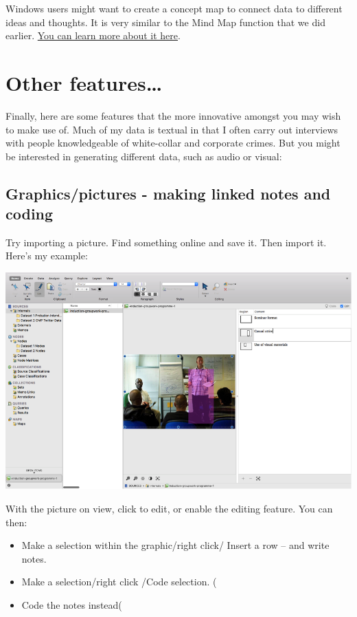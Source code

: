 \documentclass[]{book}
\providecommand{\tightlist}{%
  \setlength{\itemsep}{0pt}\setlength{\parskip}{0pt}}
\theoremstyle{definition}
\theoremstyle{definition}
\theoremstyle{definition}
\theoremstyle{remark}
\begin{document}
Windows users might want to create a concept map to connect data to
different ideas and thoughts. It is very similar to the Mind Map
function that we did earlier.
\href{https://www.youtube.com/watch?v=3R5gZKdOJD4}{You can learn more
about it here}.

\hypertarget{other-features}{%
\section{Other features\ldots{}}\label{other-features}}

Finally, here are some features that the more innovative amongst you may
wish to make use of. Much of my data is textual in that I often carry
out interviews with people knowledgeable of white-collar and corporate
crimes. But you might be interested in generating different data, such
as audio or visual:

\hypertarget{graphicspictures---making-linked-notes-and-coding}{%
\subsection{Graphics/pictures - making linked notes and
coding}\label{graphicspictures---making-linked-notes-and-coding}}

Try importing a picture. Find something online and save it. Then import
it. Here's my example:

\includegraphics{imgs/qual_56.png}

With the picture on view, click to edit, or enable the editing feature.
You can then:

\begin{itemize}
\tightlist
\item
  Make a selection within the graphic/right click/ Insert a row -- and
  write notes.
\item
  Make a selection/right click /Code selection. (
\item
  Code the notes instead(
\end{itemize}
\end{document}
